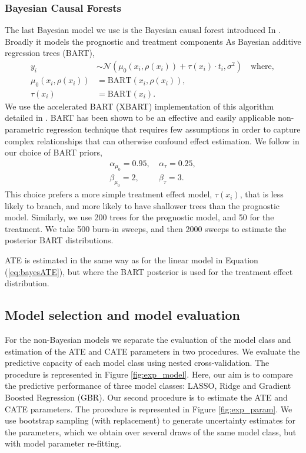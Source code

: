 \documentclass[12pt, a4paper]{article}
\begin{document}
\subsubsection*{Bayesian Causal Forests}
The last Bayesian model we use is the Bayesian causal forest introduced In
\citet{hahn2020}. Broadly it models the prognostic and treatment components As
Bayesian additive regression trees (BART),
\begin{align*}
y_i &\sim \mathcal{N}\!\left(
  \mu_0(x_i, \rho(x_i)) + \tau(x_i)\cdot t_i, 
  \sigma^2\right) 
  \quad\textrm{where}, \\
\mu_0(x_i, \rho(x_i)) &= \textrm{BART}(x_i, \rho(x_i)), \\
\tau(x_i) &= \textrm{BART}(x_i).
\end{align*}
We use the accelerated BART (XBART) implementation of this algorithm detailed 
in \citet{krantsevich2022}. BART \citep{chipman2010} has been shown to be an 
effective and easily applicable non-parametric regression technique that 
requires few assumptions in order to capture complex relationships that can 
otherwise confound effect estimation. We follow \cite{hahn2020} in our choice
of BART priors,
\begin{align*}
  \alpha_{\mu_0} = 0.95,&~
  \alpha_{\tau} = 0.25, \\
  \beta_{\mu_0} = 2,&~
  \beta_{\tau} = 3.
\end{align*}
This choice prefers a more simple treatment effect model, $\tau(x_i)$, that is
less likely to branch, and more likely to have shallower trees 
than the prognostic model. Similarly, we use 200 trees for the prognostic model,
and 50 for the treatment. We take 500 burn-in sweeps, and then 2000 sweeps
to estimate the posterior BART distributions.

ATE is estimated in the same way as for the linear model in Equation 
(\ref{eq:bayesATE}), but where the BART posterior is used for the 
treatment effect distribution.


\subsection{Model selection and model evaluation}

For the non-Bayesian models we separate the evaluation of the model class and
estimation of the ATE and CATE parameters in two procedures. We evaluate the
predictive capacity of each model class using nested cross-validation. The
procedure is represented in Figure \ref{fig:exp_model}. Here, our aim is to
compare the predictive performance of three model classes: LASSO, Ridge and
Gradient Boosted Regression (GBR). Our second procedure is to estimate the ATE
and CATE parameters. The procedure is represented in Figure
\ref{fig:exp_param}. We use bootstrap sampling (with replacement) to generate
uncertainty estimates for the parameters, which we obtain over several draws of
the same model class, but with model parameter re-fitting.
\end{document}
